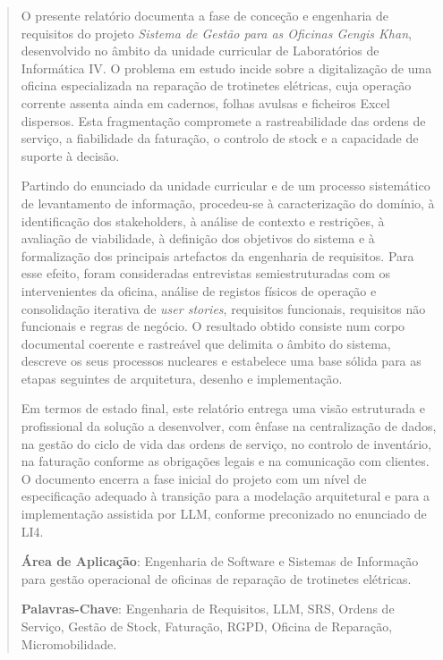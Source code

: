 \documentclass[a4paper,12pt]{scrreprt}
\begin{document}
\begin{flushleft}
\begin{abstract}
    O presente relatório documenta a fase de conceção e engenharia de requisitos do projeto \textit{Sistema de Gestão para as Oficinas Gengis Khan}, desenvolvido no âmbito da unidade curricular de Laboratórios de Informática IV. O problema em estudo incide sobre a digitalização de uma oficina especializada na reparação de trotinetes elétricas, cuja operação corrente assenta ainda em cadernos, folhas avulsas e ficheiros Excel dispersos. Esta fragmentação compromete a rastreabilidade das ordens de serviço, a fiabilidade da faturação, o controlo de stock e a capacidade de suporte à decisão.

    Partindo do enunciado da unidade curricular e de um processo sistemático de levantamento de informação, procedeu-se à caracterização do domínio, à identificação dos stakeholders, à análise de contexto e restrições, à avaliação de viabilidade, à definição dos objetivos do sistema e à formalização dos principais artefactos da engenharia de requisitos. Para esse efeito, foram consideradas entrevistas semiestruturadas com os intervenientes da oficina, análise de registos físicos de operação e consolidação iterativa de \textit{user stories}, requisitos funcionais, requisitos não funcionais e regras de negócio. O resultado obtido consiste num corpo documental coerente e rastreável que delimita o âmbito do sistema, descreve os seus processos nucleares e estabelece uma base sólida para as etapas seguintes de arquitetura, desenho e implementação.

    Em termos de estado final, este relatório entrega uma visão estruturada e profissional da solução a desenvolver, com ênfase na centralização de dados, na gestão do ciclo de vida das ordens de serviço, no controlo de inventário, na faturação conforme as obrigações legais e na comunicação com clientes. O documento encerra a fase inicial do projeto com um nível de especificação adequado à transição para a modelação arquitetural e para a implementação assistida por LLM, conforme preconizado no enunciado de LI4.
    \par \textbf{Área de Aplicação}: Engenharia de Software e Sistemas de Informação para gestão operacional de oficinas de reparação de trotinetes elétricas.
    \par \textbf{Palavras-Chave}: Engenharia de Requisitos, LLM, SRS, Ordens de Serviço, Gestão de Stock, Faturação, RGPD, Oficina de Reparação, Micromobilidade.
\end{abstract}
\end{flushleft}
\end{document}
